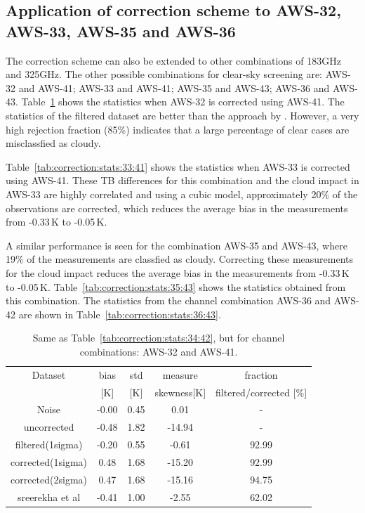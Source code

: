 \documentclass[12pt]{article}
\begin{document}
\subsection{Application of correction scheme to AWS-32, AWS-33, AWS-35 and AWS-36}
The correction scheme can also be extended to other combinations of 183GHz and 325GHz. The other possible combinations for clear-sky screening are: AWS-32 and AWS-41; AWS-33 and AWS-41; AWS-35 and AWS-43; AWS-36 and AWS-43.
% 
Table~\ref{tab:correction:stats:32:41}  shows the statistics when AWS-32 is corrected using AWS-41. The statistics of the filtered dataset are better than the approach by \cite{rekha2012potential}. However, a very high rejection fraction (85\%) indicates that a large percentage of clear cases are misclassfied as cloudy.  

Table~\ref{tab:correction:stats:33:41} shows the statistics when AWS-33 is corrected using AWS-41. These TB differences for this combination and the cloud impact in AWS-33 are highly correlated and using a cubic model, approximately 20\% of the observations are corrected, which reduces the average bias in the measurements from -0.33\,K to -0.05\,K. 

A similar performance is seen for the combination AWS-35 and AWS-43, where 19\% of the measurements are classfied as cloudy. Correcting these measurements for the cloud impact reduces the average bias in the measurements from -0.33\,K to -0.05\,K.  Table~\ref{tab:correction:stats:35:43}  shows the statistics obtained from this combination.
The statistics from the channel combination AWS-36 and AWS-42 are shown in Table~\ref{tab:correction:stats:36:43}.
\begin{table}[!bt]
	\centering
	\begin{tabular}[b]{c|c|c|c|c}
		Dataset  		  &   bias &   std &   measure & fraction \\
		&   [K]  &   [K] & skewness[K] & filtered/corrected [\%]\\
		\hline
 Noise             &  -0.00 &  0.45 &               0.01 &               - \\
uncorrected       &  -0.48 &  1.82 &             -14.94 &                - \\
filtered(1sigma)  &  -0.20 &  0.55 &              -0.61 &               92.99 \\
corrected(1sigma) &   0.48 &  1.68 &             -15.20 &               92.99 \\
corrected(2sigma) &   0.47 &  1.68 &             -15.16 &               94.75 \\
sreerekha et al   &  -0.41 &  1.00 &              -2.55 &               62.02 \\	
		\hline
	\end{tabular}
	\caption{Same as Table~\ref{tab:correction:stats:34:42}, but for channel combinations: AWS-32 and AWS-41.   }
	\label{tab:correction:stats:32:41}
\end{table}
\end{document}
